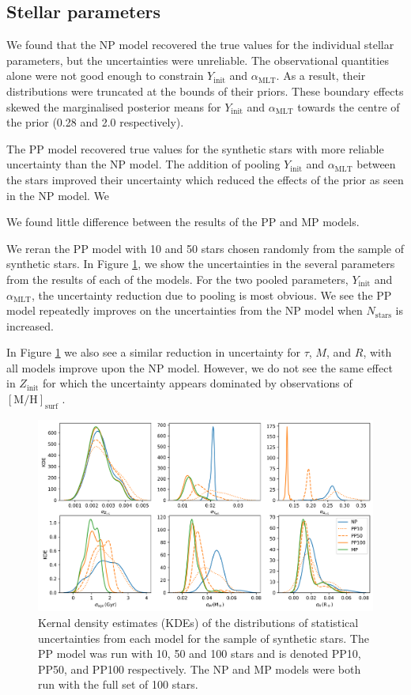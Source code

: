 \documentclass[fleqn,usenatbib]{mnras}
\newcommand{\metallicity}{\ensuremath{[\mathrm{M}/\mathrm{H}]}}
\newcommand{\mlt}{\ensuremath{{\alpha_\mathrm{MLT}}}}
\begin{document}
\subsection{Stellar parameters}

We found that the NP model recovered the true values for the individual stellar parameters, but the uncertainties were unreliable. The observational quantities alone were not good enough to constrain $Y_\mathrm{init}$ and $\mlt$. As a result, their distributions were truncated at the bounds of their priors. These boundary effects skewed the marginalised posterior means for $Y_\mathrm{init}$ and $\mlt$ towards the centre of the prior (0.28 and 2.0 respectively).

The PP model recovered true values for the synthetic stars with more reliable uncertainty than the NP model. The addition of pooling $Y_\mathrm{init}$ and $\mlt$ between the stars improved their uncertainty which reduced the effects of the prior as seen in the NP model. We

We found little difference between the results of the PP and MP models.

We reran the PP model with 10 and 50 stars chosen randomly from the sample of synthetic stars. In Figure \ref{fig:shrinkage}, we show the uncertainties in the several parameters from the results of each of the models. For the two pooled parameters, $Y_\mathrm{init}$ and $\mlt$, the uncertainty reduction due to pooling is most obvious. We see the PP model repeatedly improves on the uncertainties from the NP model when $N_\mathrm{stars}$ is increased. 

In Figure \ref{fig:shrinkage} we also see a similar reduction in uncertainty for $\tau$, $M$, and $R$, with all models improve upon the NP model. However, we do not see the same effect in $Z_\mathrm{init}$ for which the uncertainty appears dominated by observations of $\metallicity_\mathrm{surf}$ .

\begin{figure}
    \centering
    \includegraphics[width=\textwidth]{figures/shrinkage.png}
    \caption{Kernal density estimates (KDEs) of the distributions of statistical uncertainties from each model for the sample of synthetic stars. The PP model was run with 10, 50 and 100 stars and is denoted PP10, PP50, and PP100 respectively. The NP and MP models were both run with the full set of 100 stars.}
    \label{fig:shrinkage}
\end{figure}
\end{document}
